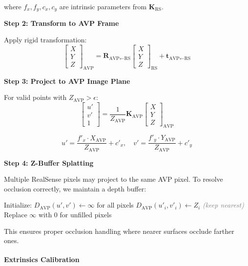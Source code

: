 where $f_x, f_y, c_x, c_y$ are intrinsic parameters from $\mathbf{K}_{\text{RS}}$.

\textbf{Step 2: Transform to AVP Frame}

Apply rigid transformation:
\[
\begin{bmatrix} X \\ Y \\ Z \end{bmatrix}_{\text{AVP}}
= \mathbf{R}_{\text{AVP←RS}} \begin{bmatrix} X \\ Y \\ Z \end{bmatrix}_{\text{RS}}
+ \mathbf{t}_{\text{AVP←RS}}
\]

\textbf{Step 3: Project to AVP Image Plane}

For valid points with $Z_{\text{AVP}} > \epsilon$:
\[
\begin{bmatrix} u' \\ v' \\ 1 \end{bmatrix}
= \frac{1}{Z_{\text{AVP}}} \mathbf{K}_{\text{AVP}} \begin{bmatrix} X \\ Y \\ Z \end{bmatrix}_{\text{AVP}}
\]

\[
u' = \frac{f'_x \cdot X_{\text{AVP}}}{Z_{\text{AVP}}} + c'_x, \quad
v' = \frac{f'_y \cdot Y_{\text{AVP}}}{Z_{\text{AVP}}} + c'_y
\]

\textbf{Step 4: Z-Buffer Splatting}

Multiple RealSense pixels may project to the same AVP pixel. To resolve occlusion correctly, we maintain a depth buffer:

\begin{algorithmic}
\STATE Initialize: $D_{\text{AVP}}(u', v') \leftarrow \infty$ for all pixels
        \STATE $D_{\text{AVP}}(u'_i, v'_i) \leftarrow Z_i$ \quad \textcolor{gray}{\textit{(keep nearest)}}
    \ENDIF
\ENDFOR
\STATE Replace $\infty$ with 0 for unfilled pixels
\end{algorithmic}

This ensures proper occlusion handling where nearer surfaces occlude farther ones.

\paragraph{Extrinsics Calibration}

